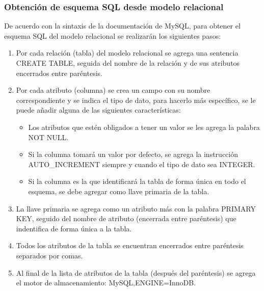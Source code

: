 \subsubsection{Obtención de esquema SQL desde modelo relacional}\label{sec:esquema-sql}


De acuerdo con la sintaxis de la documentación de MySQL\cite{mysql_mysql_2020}, para obtener el esquema SQL del modelo relacional se realizarán los siguientes pasos:

\begin{enumerate}
  \item Por cada relación (tabla) del modelo relacional se agrega una sentencia CREATE TABLE, seguida del nombre de la relación y de sus atributos encerrados entre paréntesis.
  \item Por cada atributo (columna) se crea un campo con su nombre correspondiente y se indica el tipo de dato, para hacerlo más específico, se le puede añadir alguna de las siguientes características:
  \begin{itemize}
    \item Los atributos que estén obligados a tener un valor se les agrega la palabra NOT NULL.
    \item Si la columna tomará un valor por defecto, se agrega la instrucción AUTO\_INCREMENT siempre y cuando el tipo de dato sea INTEGER.
    \item Si la columna es la que identificará la tabla de forma única en todo el esquema, se debe agregar como llave primaria de la tabla.
  \end{itemize}
  \item La llave primaria se agrega como un atributo más con la palabra PRIMARY KEY, seguido del nombre de atributo (encerrada entre paréntesis) que indentifica de forma única a la tabla.
  \item Todos los atributos de la tabla se encuentran encerrados entre paréntesis separados por comas.
  \item Al final de la lista de atributos de la tabla (después del paréntesis) se agrega el motor de almacenamiento: MySQL,ENGINE=InnoDB.
\end{enumerate}
